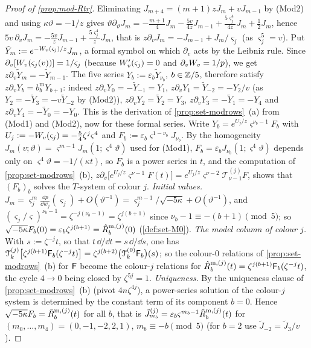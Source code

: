 \begin{proof}[Proof of \cref{prop:mod-Rtr}]
Eliminating $J_{m+4}=(m+1)zJ_m+vJ_{m-1}$ by (Mod2) and using $\kappa\vartheta=-1/z$ gives $\vartheta\partial_\vartheta J_m=-\frac{m+1}4J_m-\frac{5v}{4z}J_{m-1}+\frac{5\varsigma_j^4}{4z}J_m+\frac12J_m$, hence $5v\,\partial_vJ_m=-\frac{5v}{z}J_{m-1}+\frac{5\varsigma_j^4}{z}J_m$, that is $z\partial_vJ_m=-J_{m-1}+J_m/\varsigma_j$ (as $\varsigma_j^5=v$). Put $\tilde Y_m:=e^{-W_{v}(\varsigma_j)/z}J_m$, a formal symbol on which $\partial_v$ acts by the Leibniz rule. Since $\partial_v[W_{v}(\varsigma_j(v))]=1/\varsigma_j$ (because $W_{v}'(\varsigma_j)=0$ and $\partial_vW_{v}=1/p$), we get $z\partial_v\tilde Y_m=-\tilde Y_{m-1}$. The five series $Y_b:=\varepsilon_b\tilde Y_{\nu_b}$, $b\in\mathbb{Z}/5$, therefore satisfy $z\partial_vY_b=b^{\mathrm m}_bY_{b+1}$: indeed $z\partial_vY_0=-\tilde Y_{-1}=Y_1$, $z\partial_vY_1=\tilde Y_{-2}=-Y_2/v$ (as $Y_2=-\tilde Y_3=-v\tilde Y_{-2}$ by (Mod2)), $z\partial_vY_2=\tilde Y_2=Y_3$, $z\partial_vY_3=-\tilde Y_1=-Y_4$ and $z\partial_vY_4=-\tilde Y_0=-Y_0$. This is the derivation of \cref{prop:set-modrows}~(a) from (Mod1) and (Mod2), now for these formal series. Write $Y_b=e^{U_j/z}\varsigma^{\nu_b-1}F_b$ with $U_j:=-W_{v}(\varsigma_j)=-\frac54\zeta^j\varsigma^4$ and $F_b:=\varepsilon_b\varsigma^{1-\nu_b}J_{\nu_b}$. By the homogeneity $J_m(v;\vartheta)=\varsigma^{m-1}J_m(1;\varsigma^4\vartheta)$ used for (Mod1), $F_b=\varepsilon_bJ_{\nu_b}(1;\varsigma^4\vartheta)$ depends only on $\varsigma^4\vartheta=-1/(\kappa t)$, so $F_b$ is a power series in $t$, and the computation of \cref{prop:set-modrows}~(b), $z\partial_v\big[e^{U_j/z}\varsigma^{\nu-1}F(t)\big]=e^{U_j/z}\varsigma^{\nu-2}\mathcal T^{(j)}_{\nu-1}F$, shows that $(F_b)_b$ solves the $T$-system of colour $j$. \emph{Initial values.} $J_m=\varsigma_j^m\frac{\dd p}{\dd w_j}(\varsigma_j)+O(\vartheta^{-1})=\varsigma_j^{m-1}/\sqrt{-5\kappa}+O(\vartheta^{-1})$, and $(\varsigma_j/\varsigma)^{\nu_b-1}=\zeta^{-j(\nu_b-1)}=\zeta^{j(b+1)}$ since $\nu_b-1\equiv -(b+1)\pmod 5$; so $\sqrt{-5\kappa}F_b(0)=\varepsilon_b\zeta^{j(b+1)}=\hat{R}^{\mathrm m,(j)}_b(0)$ (\cref{def:set-M0}). \emph{The model column of colour $j$.} With $s:=\zeta^{-j}t$, so that $t\,\dd/\dd t=s\,\dd/\dd s$, one has $\mathcal T^{(j)}_k\big[\zeta^{j(b+1)}\mathsf{F}_b(\zeta^{-j}t)\big]=\zeta^{j(b+2)}\big(\mathcal T^{(0)}_k\mathsf{F}_b\big)(s)$; so the colour-$0$ relations of \cref{prop:set-modrows}~(b) for $\mathsf{F}$ become the colour-$j$ relations for $\hat{R}^{\mathrm m,(j)}_b(t)=\zeta^{j(b+1)}\mathsf{F}_b(\zeta^{-j}t)$, the cycle $4\to 0$ being closed by $\zeta^{5j}=1$. \emph{Uniqueness.} By the uniqueness clause of \cref{prop:set-modrows}~(b) (pivot $4n\zeta^{4j}$), a power-series solution of the colour-$j$ system is determined by the constant term of its component $b=0$. Hence $\sqrt{-5\kappa}F_b=\hat{R}^{\mathrm m,(j)}_b(t)$ for all $b$, that is $\tilde J^{(j)}_{m_b}=\varepsilon_b\varsigma^{m_b-1}\hat{R}^{\mathrm m,(j)}_b(t)$ for $(m_0,\dots,m_4)=(0,-1,-2,2,1)$, $m_b\equiv -b\pmod 5$ (for $b=2$ use $\tilde J_{-2}=\tilde J_3/v$).


\end{proof}
